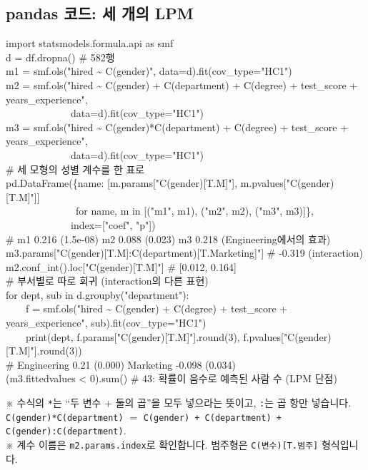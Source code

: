 \documentclass[11pt,a4paper]{article}
\newcommand{\code}[1]{\texttt{#1}}
\newcommand{\aside}[1]{{\footnotesize\color{black!65}#1}}
\begin{document}
\subsection*{pandas 코드: 세 개의 LPM}
\begin{codebox}
import statsmodels.formula.api as smf\\
d = df.dropna() \hfill \# 582행\\[3pt]
m1 = smf.ols("hired \~{} C(gender)", data=d).fit(cov\_type="HC1")\\
m2 = smf.ols("hired \~{} C(gender) + C(department) + C(degree) + test\_score + years\_experience",\\
\ \ \ \ \ \ \ \ \ \ \ \ \ data=d).fit(cov\_type="HC1")\\
m3 = smf.ols("hired \~{} C(gender)*C(department) + C(degree) + test\_score + years\_experience",\\
\ \ \ \ \ \ \ \ \ \ \ \ \ data=d).fit(cov\_type="HC1")\\[3pt]
\# 세 모형의 성별 계수를 한 표로\\
pd.DataFrame(\{name: [m.params["C(gender)[T.M]"], m.pvalues["C(gender)[T.M]"]]\\
\ \ \ \ \ \ \ \ \ \ \ \ \ \ for name, m in [("m1", m1), ("m2", m2), ("m3", m3)]\},\\
\ \ \ \ \ \ \ \ \ \ \ \ \ index=["coef", "p"])\\
\# m1 0.216 (1.5e-08) \quad m2 0.088 (0.023) \quad m3 0.218 (Engineering에서의 효과)\\[3pt]
m3.params["C(gender)[T.M]:C(department)[T.Marketing]"] \hfill \# -0.319 (interaction)\\
m2.conf\_int().loc["C(gender)[T.M]"] \hfill \# [0.012, 0.164]\\[3pt]
\# 부서별로 따로 회귀 (interaction의 다른 표현)\\
for dept, sub in d.groupby("department"):\\
\ \ \ \ f = smf.ols("hired \~{} C(gender) + C(degree) + test\_score + years\_experience", sub).fit(cov\_type="HC1")\\
\ \ \ \ print(dept, f.params["C(gender)[T.M]"].round(3), f.pvalues["C(gender)[T.M]"].round(3))\\
\# Engineering 0.21 (0.000) \quad Marketing -0.098 (0.034)\\[3pt]
(m3.fittedvalues < 0).sum() \hfill \# 43: 확률이 음수로 예측된 사람 수 (LPM 단점)
\end{codebox}
\aside{※ 수식의 \code{*}는 ``두 변수 + 둘의 곱''을 모두 넣으라는 뜻이고, \code{:}는 곱 항만 넣습니다. \code{C(gender)*C(department)} $=$ \code{C(gender) + C(department) + C(gender):C(department)}.}\\
\aside{※ 계수 이름은 \code{m2.params.index}로 확인합니다. 범주형은 \code{C(변수)[T.범주]} 형식입니다.}
\end{document}
